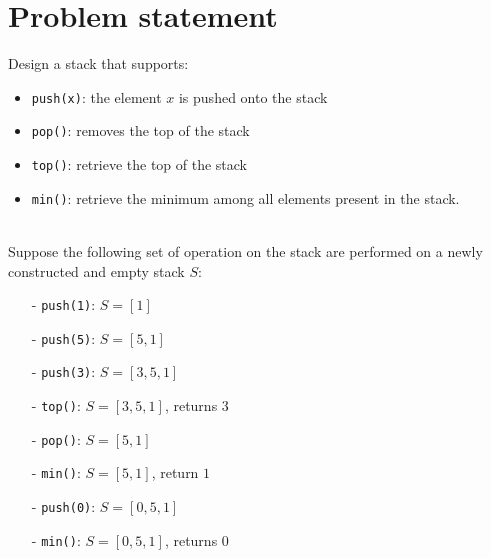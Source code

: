 \section{Problem statement}
\begin{exercise}
Design  a stack that supports:

\begin{itemize}
	\item \lstinline[columns=fixed]{push(x)}: the element $x$ is pushed onto the stack
	\item \lstinline[columns=fixed]{pop()}: removes the top of the stack
	\item \lstinline[columns=fixed]{top()}: retrieve the top of the stack
	\item \lstinline[columns=fixed]{min()}: retrieve the minimum among all elements present in the stack.
\end{itemize}


	\begin{example}
		\hfill \\
		Suppose the following set of operation on the stack are performed on a newly constructed and empty stack $S$:
		\begin{itemize}
			\item[-] \lstinline[columns=fixed]{push(1)}: $S=[1]$
			\item[-] \lstinline[columns=fixed]{push(5)}: $S=[5,1]$
			\item[-] \lstinline[columns=fixed]{push(3)}: $S=[3,5,1]$
			\item[-] \lstinline[columns=fixed]{top()}: $S=[3,5,1]$, returns $3$
			\item[-] \lstinline[columns=fixed]{pop()}: $S=[5,1]$
			\item[-] \lstinline[columns=fixed]{min()}: $S=[5,1]$, return $1$
			\item[-] \lstinline[columns=fixed]{push(0)}: $S=[0,5,1]$
			\item[-] \lstinline[columns=fixed]{min()}: $S=[0,5,1]$, returns $0$
		\end{itemize}

	\end{example}


\end{exercise}
